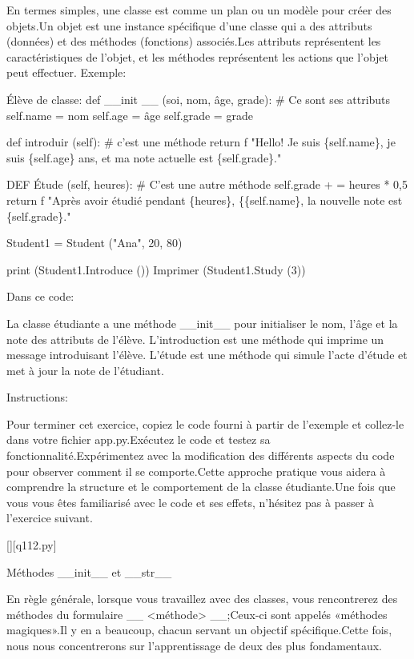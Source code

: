 En termes simples, une classe est comme un plan ou un modèle pour créer des objets.Un objet est une instance spécifique d'une classe qui a des attributs (données) et des méthodes (fonctions) associés.Les attributs représentent les caractéristiques de l'objet, et les méthodes représentent les actions que l'objet peut effectuer.
Exemple:

Élève de classe:
def \_\_init \_\_ (soi, nom, âge, grade): \# Ce sont ses attributs
self.name = nom
self.age = âge
self.grade = grade

def introduir (self): \# c'est une méthode
return f "Hello! Je suis \{self.name\}, je suis \{self.age\} ans, et ma note actuelle est \{self.grade\}."

DEF Étude (self, heures): \# C'est une autre méthode
self.grade + = heures * 0,5
return f "Après avoir étudié pendant \{heures\}, \{\{self.name\}, la nouvelle note est \{self.grade\}."

Student1 = Student ("Ana", 20, 80)

print (Student1.Introduce ())
Imprimer (Student1.Study (3))

Dans ce code:

La classe étudiante a une méthode \_\_init\_\_ pour initialiser le nom, l'âge et la note des attributs de l'élève.
L'introduction est une méthode qui imprime un message introduisant l'élève.
L'étude est une méthode qui simule l'acte d'étude et met à jour la note de l'étudiant.

Instructions:

Pour terminer cet exercice, copiez le code fourni à partir de l'exemple et collez-le dans votre fichier app.py.Exécutez le code et testez sa fonctionnalité.Expérimentez avec la modification des différents aspects du code pour observer comment il se comporte.Cette approche pratique vous aidera à comprendre la structure et le comportement de la classe étudiante.Une fois que vous vous êtes familiarisé avec le code et ses effets, n'hésitez pas à passer à l'exercice suivant.
        \par
        \renewcommand{\nomfichier}{q112.py}
        \begin{solution}
            \pythonfile{\chemincode \nomfichier}[][\nomfichier]
        \end{solution}
        

        \question
        Méthodes \_\_init\_\_ et \_\_str\_\_

En règle générale, lorsque vous travaillez avec des classes, vous rencontrerez des méthodes du formulaire \_\_ <méthode> \_\_;Ceux-ci sont appelés «méthodes magiques».Il y en a beaucoup, chacun servant un objectif spécifique.Cette fois, nous nous concentrerons sur l'apprentissage de deux des plus fondamentaux.

